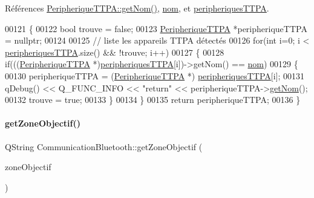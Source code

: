 Références \hyperlink{class_peripherique_t_t_p_a_abb04680791a7e778ac3808b5d218421f}{Peripherique\+T\+T\+P\+A\+::get\+Nom()}, \hyperlink{class_communication_bluetooth_a320cc60a0cb6b4ea9e009fef2853f1d2}{nom}, et \hyperlink{class_communication_bluetooth_a656a80f8216d2a4db7cf2f865365e562}{peripheriques\+T\+T\+PA}.


\begin{DoxyCode}
00121 \{
00122     \textcolor{keywordtype}{bool} trouve = \textcolor{keyword}{false};
00123     \hyperlink{class_peripherique_t_t_p_a}{PeripheriqueTTPA} *peripheriqueTTPA = \textcolor{keyword}{nullptr};
00124 
00125     \textcolor{comment}{// liste les appareils TTPA détectés}
00126     \textcolor{keywordflow}{for}(\textcolor{keywordtype}{int} i=0; i < \hyperlink{class_communication_bluetooth_a656a80f8216d2a4db7cf2f865365e562}{peripheriquesTTPA}.size() && !trouve; i++)
00127     \{
00128         \textcolor{keywordflow}{if}(((\hyperlink{class_peripherique_t_t_p_a}{PeripheriqueTTPA} *)\hyperlink{class_communication_bluetooth_a656a80f8216d2a4db7cf2f865365e562}{peripheriquesTTPA}[i])->getNom() == 
      \hyperlink{class_communication_bluetooth_a320cc60a0cb6b4ea9e009fef2853f1d2}{nom})
00129         \{
00130             peripheriqueTTPA = (\hyperlink{class_peripherique_t_t_p_a}{PeripheriqueTTPA} *)
      \hyperlink{class_communication_bluetooth_a656a80f8216d2a4db7cf2f865365e562}{peripheriquesTTPA}[i];
00131             qDebug() << Q\_FUNC\_INFO << \textcolor{stringliteral}{"return"} << peripheriqueTTPA->\hyperlink{class_peripherique_t_t_p_a_abb04680791a7e778ac3808b5d218421f}{getNom}();
00132             trouve = \textcolor{keyword}{true};
00133         \}
00134     \}
00135     \textcolor{keywordflow}{return} peripheriqueTTPA;
00136 \}
\end{DoxyCode}
\mbox{\label{class_communication_bluetooth_a6fcee1677888958590d5f80a5149aabf}} 
\paragraph{\texorpdfstring{get\+Zone\+Objectif()}{getZoneObjectif()}}
{\footnotesize\ttfamily Q\+String Communication\+Bluetooth\+::get\+Zone\+Objectif (\begin{DoxyParamCaption}\item[{Q\+String}]{zone\+Objectif }\end{DoxyParamCaption})}


